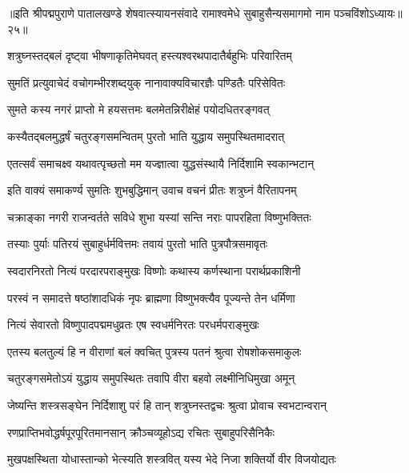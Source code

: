 {॥इति श्रीपद्मपुराणे पातालखण्डे शेषवात्स्यायनसंवादे रामाश्वमेधे सुबाहुसैन्यसमागमो नाम पञ्चविंशोऽध्यायः॥२५॥}



\twolineshloka
{शत्रुघ्नस्तद्बलं दृष्ट्वा भीषणाकृतिमेघवत्}
{हस्त्यश्वरथपादातैर्बहुभिः परिवारितम्}%

\twolineshloka
{सुमतिं प्रत्युवाचेदं वचोगम्भीरशब्दयुक्}
{नानावाक्यविचारज्ञैः पण्डितैः परिसेवितः}%


\twolineshloka
{सुमते कस्य नगरं प्राप्तो मे हयसत्तमः}
{बलमेतन्निरीक्षेहं पयोदधितरङ्गवत्}%

\twolineshloka
{कस्यैतद्बलमुद्धर्षं चतुरङ्गसमन्वितम्}
{पुरतो भाति युद्धाय समुपस्थितमादरात्}%

\twolineshloka
{एतत्सर्वं समाचक्ष्व यथावत्पृच्छतो मम}
{यज्ज्ञात्वा युद्धसंस्थायै निर्दिशामि स्वकान्भटान्}%

\twolineshloka
{इति वाक्यं समाकर्ण्य सुमतिः शुभबुद्धिमान्}
{उवाच वचनं प्रीतः शत्रुघ्नं वैरितापनम्}%


\twolineshloka
{चक्राङ्का नगरी राजन्वर्तते सविधे शुभा}
{यस्यां सन्ति नराः पापरहिता विष्णुभक्तितः}%

\twolineshloka
{तस्याः पुर्याः पतिरयं सुबाहुर्धर्मवित्तमः}
{तवायं पुरतो भाति पुत्रपौत्रसमावृतः}%

\twolineshloka
{स्वदारनिरतो नित्यं परदारपराङ्मुखः}
{विष्णोः कथास्य कर्णस्थाना परार्थप्रकाशिनी}%

\twolineshloka
{परस्वं न समादत्ते षष्ठांशादधिकं नृपः}
{ब्राह्मणा विष्णुभक्त्यैव पूज्यन्ते तेन धर्मिणा}%

\twolineshloka
{नित्यं सेवारतो विष्णुपादपद्ममधुव्रतः}
{एष स्वधर्मनिरतः परधर्मपराङ्मुखः}%

\twolineshloka
{एतस्य बलतुल्यं हि न वीराणां बलं क्वचित्}
{पुत्रस्य पतनं श्रुत्वा रोषशोकसमाकुलः}%

\twolineshloka
{चतुरङ्गसमेतोऽयं युद्धाय समुपस्थितः}
{तवापि वीरा बहवो लक्ष्मीनिधिमुखा अमून्}%

\twolineshloka
{जेष्यन्ति शस्त्रसङ्घेन निर्दिशाशु परं हि तान्}
{शत्रुघ्नस्तद्वचः श्रुत्वा प्रोवाच स्वभटान्वरान्}%

\twolineshloka
{रणप्राप्तिभवोद्धर्षपूरपूरितमानसान्}
{क्रौञ्चव्यूहोऽद्य रचितः सुबाहुपरिसैनिकैः}%

\twolineshloka
{मुखपक्षस्थिता योधास्तान्को भेत्स्यति शस्त्रवित्}
{यस्य भेदे निजा शक्तिर्यो वीर विजयोद्यतः}%

